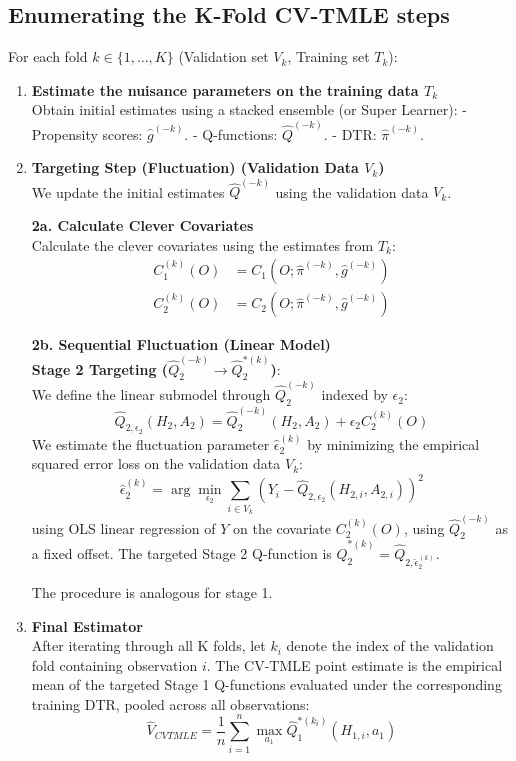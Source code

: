 \documentclass{article}
\begin{document}
\subsection{Enumerating the K-Fold CV-TMLE steps}
For each fold $k \in \{1, \dots, K\}$ (Validation set $V_k$, Training set $T_k$):
\begin{enumerate}
	\item \textbf{Estimate the nuisance parameters on the training data $T_k$} \\
	      Obtain initial estimates using a stacked ensemble (or Super Learner):
	      - Propensity scores: $\widehat{g}^{(-k)}$.
	      - Q-functions: $\widehat{Q}^{(-k)}$.
	      - DTR: $\widehat{\pi}^{(-k)}$.

	\item \textbf{Targeting Step (Fluctuation) (Validation Data $V_k$)} \\
	      We update the initial estimates $\widehat{Q}^{(-k)}$ using the validation data $V_k$.

	      \textbf{2a. Calculate Clever Covariates} \\
	      Calculate the clever covariates using the estimates from $T_k$:
	      $$
		      \begin{aligned}
			      C_1^{(k)}(O) & = C_1(O; \widehat{\pi}^{(-k)}, \widehat{g}^{(-k)}) \\
			      C_2^{(k)}(O) & = C_2(O; \widehat{\pi}^{(-k)}, \widehat{g}^{(-k)})
		      \end{aligned}
	      $$

	      \textbf{2b. Sequential Fluctuation (Linear Model)} \\
	      \textbf{Stage 2 Targeting ($\widehat{Q}_2^{(-k)} \to \widehat{Q}_2^{*(k)}$)}: \\
	      We define the linear submodel through $\widehat{Q}_2^{(-k)}$ indexed by $\epsilon_2$:
	      $$ \widehat{Q}_{2, \epsilon_2}(H_2, A_2) = \widehat{Q}_2^{(-k)}(H_2, A_2) + \epsilon_2 C_2^{(k)}(O) $$
	      We estimate the fluctuation parameter $\widehat{\epsilon}_2^{(k)}$ by minimizing the empirical squared error loss on the validation data $V_k$:
	      $$ \widehat{\epsilon}_2^{(k)} = \arg\min_{\epsilon_2} \sum_{i \in V_k} \left( Y_i - \widehat{Q}_{2, \epsilon_2}(H_{2,i}, A_{2,i}) \right)^2 $$
	      using OLS linear regression of $Y$ on the covariate $C_2^{(k)}(O)$, using $\widehat{Q}_2^{(-k)}$ as a fixed offset. The targeted Stage 2 Q-function is $\widehat{Q}_2^{*(k)} = \widehat{Q}_{2, \widehat{\epsilon}_2^{(k)}}$.

	      The procedure is analogous for stage 1.

	\item \textbf{Final Estimator} \\
	      After iterating through all K folds, let $k_i$ denote the index of the validation fold containing observation $i$. The CV-TMLE point estimate is the empirical mean of the targeted Stage 1 Q-functions evaluated under the corresponding training DTR, pooled across all observations:
	      $$ \widehat{V}_{CVTMLE} = \frac{1}{n} \sum_{i=1}^n \max_{a_1}\widehat{Q}_1^{*(k_i)}(H_{1,i}, a_1) $$
\end{enumerate}
\end{document}
